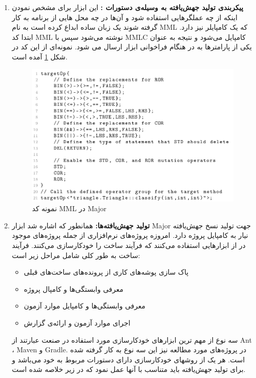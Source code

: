 \begin{enumerate}
\item

\textbf{پیکربندی تولید جهش‌یافته به وسیله‌ی دستورات : }
این ابزار برای مشخص نمودن اینکه از چه عملگرهایی استفاده شود و آن‌ها در چه محل هایی از برنامه به کار گرفته شوند یک زبان ساده ابداع کرده است به نام MML که یک کامپایلر نیز دارد. ابتدا کد MML نوشته می‌شود سپس با MMLC کامپایل می‌شود و نتیجه به عنوان یکی از پارامترها به در هنگام فراخوانی ابزار ارسال می شود. نمونه‌ای از این کد در شکل \ref{fig:major-mml} آمده است. 

\begin{figure}[H]
	\centering
	\includegraphics[width=.8\textwidth]{img/case_study/major-mml.png}
	\caption{نمونه کد MML در Major}
	\label{fig:major-mml}
\end{figure}
\item 	
\textbf{تولید جهش‌یافته‌ها:}
 همانطور که اشاره شد ابزار Major جهت تولید نسخ جهش‌یافته نیار به کامپایل پروژه دارد. امروزه پروژه‌های نرم‌افزاری از جمله پروژه‌های موجود در  از ابزارهایی استفاده می‌کنند که فرآیند ساخت را خودکارسازی می‌کنند. فرآیند ساخت به طور کلی شامل مراحل زیر است:
\begin{itemize}
	\item پاک سازی  پوشه‌های کاری از پرونده‌های ساخت‌های قبلی
	\item 
	معرفی‌ وابستگی‌ها و کامپال پروژه
	\item
	معرفی وابستگی‌ها و کامپایل موارد آزمون
	\item
	اجرای موارد آزمون و ارائه‌ی گزارش
\end{itemize}
سه نوع از مهم ترین ابزارهای خودکارسازی مورد استفاده در صنعت عبارتند از Ant ،  Maven و Gradle. در پروژه‌های مورد مطالعه نیز این سه نوع به کار گرفته شده است.  
هر یک از روشهای خودکارسازی دارای دستورات مربوط به خود می‌باشد  و برای تولید جهش‌یافته باید متناسب با آنها عمل نمود که در زیر خلاصه شده است. 

\end{enumerate}

